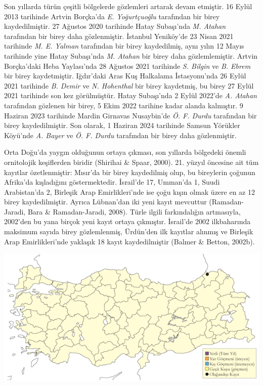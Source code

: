 \documentclass[
  a4paper,
  DIV=11,
  numbers=noendperiod]{scrreprt}
\begin{document}
Son yıllarda türün çeşitli bölgelerde gözlemleri artarak devam etmiştir.
16 Eylül 2013 tarihinde Artvin Borçka'da \emph{E. Yoğurtçuoğlu}
tarafından bir birey kaydedilmiştir. 27 Ağustos 2020 tarihinde Hatay
Subaşı'nda \emph{M. Atahan} tarafından bir birey daha gözlenmiştir.
İstanbul Yeniköy'de 23 Nisan 2021 tarihinde \emph{M. E. Yalman}
tarafından bir birey kaydedilmiş, aynı yılın 12 Mayıs tarihinde yine
Hatay Subaşı'nda \emph{M. Atahan} bir birey daha gözlemlemiştir. Artvin
Borçka'daki Heba Yaylası'nda 28 Ağustos 2021 tarihinde \emph{S. Bilgin}
ve \emph{B. Ebrem} bir birey kaydetmiştir. Iğdır'daki Aras Kuş Halkalama
İstasyonu'nda 26 Eylül 2021 tarihinde \emph{B. Demir} ve \emph{N.
Hohenthal} bir birey kaydetmiş, bu birey 27 Eylül 2021 tarihinde son kez
görülmüştür. Hatay Subaşı'nda 2 Eylül 2022'de \emph{A. Atahan}
tarafından gözlenen bir birey, 5 Ekim 2022 tarihine kadar alanda
kalmıştır. 9 Haziran 2023 tarihinde Mardin Girnavas Nusaybin'de \emph{Ö.
F. Durdu} tarafından bir birey kaydedilmiştir. Son olarak, 1 Haziran
2024 tarihinde Samsun Yörükler Köyü'nde \emph{A. Bayer} ve \emph{Ö. F.
Durdu} tarafından bir birey daha gözlenmiştir.

Orta Doğu'da yaygın olduğunun ortaya çıkması, son yıllarda bölgedeki
önemli ornitolojik keşiflerden biridir (Shirihai \& Spaar, 2000). 21.
yüzyıl öncesine ait tüm kayıtlar özetlenmiştir: Mısır'da bir birey
kaydedilmiş olup, bu bireylerin çoğunun Afrika'da kışladığını
göstermektedir. İsrail'de 17, Umman'da 1, Suudi Arabistan'da 2, Birleşik
Arap Emirlikleri'nde ise çoğu kışın olmak üzere en az 12 birey
kaydedilmiştir. Ayrıca Lübnan'dan iki yeni kayıt mevcuttur
(Ramadan-Jaradi, Bara \& Ramadan-Jaradi, 2008). Türle ilgili
farkındalığın artmasıyla, 2002'den bu yana birçok yeni kayıt ortaya
çıkmıştır. İsrail'de 2002 ilkbaharında maksimum sayıda birey
gözlemlenmiş, Ürdün'den ilk kayıtlar alınmış ve Birleşik Arap
Emirlikleri'nde yaklaşık 18 kayıt kaydedilmiştir (Balmer \& Betton,
2002b).

\includegraphics{images/harita_Page_086.png}
\end{document}
